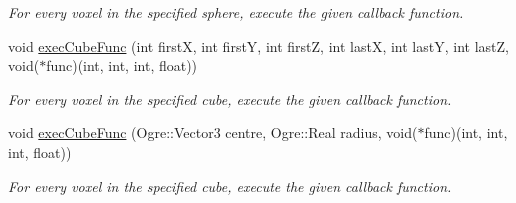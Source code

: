 \begin{DoxyCompactItemize}
\begin{DoxyCompactList}\small\item\em \-For every voxel in the specified sphere, execute the given callback function. \end{DoxyCompactList}\item 
\hypertarget{classVoxelVolume_a6b5462a047dcd380e1e079b24332dc3b}{
void \hyperlink{classVoxelVolume_a6b5462a047dcd380e1e079b24332dc3b}{exec\-Cube\-Func} (int first\-X, int first\-Y, int first\-Z, int last\-X, int last\-Y, int last\-Z, void($\ast$func)(int, int, int, float))}
\label{d0/d1c/classVoxelVolume_a6b5462a047dcd380e1e079b24332dc3b}

\begin{DoxyCompactList}\small\item\em \-For every voxel in the specified cube, execute the given callback function. \end{DoxyCompactList}\item 
\hypertarget{classVoxelVolume_ae58760e0f0f2523c02d3bad1abb908e8}{
void \hyperlink{classVoxelVolume_ae58760e0f0f2523c02d3bad1abb908e8}{exec\-Cube\-Func} (\-Ogre\-::\-Vector3 centre, \-Ogre\-::\-Real radius, void($\ast$func)(int, int, int, float))}
\label{d0/d1c/classVoxelVolume_ae58760e0f0f2523c02d3bad1abb908e8}

\begin{DoxyCompactList}\small\item\em \-For every voxel in the specified cube, execute the given callback function. \end{DoxyCompactList}\end{DoxyCompactItemize}

